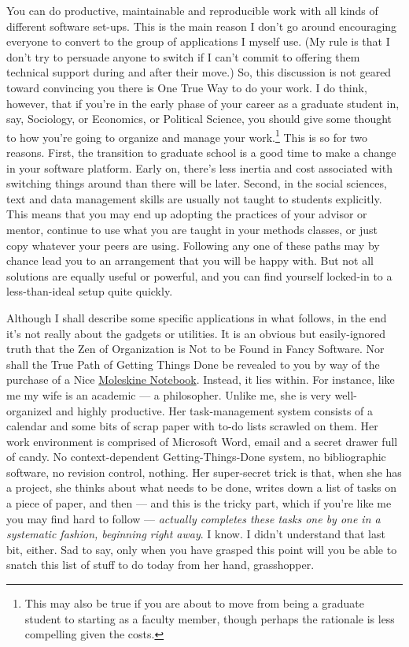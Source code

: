 \documentclass[11pt,article,oneside]{memoir}
\begin{document}
You can do productive, maintainable and reproducible work with all kinds of different software set-ups. This is the main reason I don't go around encouraging everyone to convert to the group of applications I myself use. (My rule is that I don't try to persuade anyone to switch if I can't commit to offering them technical support during and after their move.) So, this discussion is not geared toward convincing you there is One True Way to do your work. I do think, however, that if you're in the early phase of your career as a graduate student in, say, Sociology, or Economics, or Political Science, you should give some thought to how you're going to organize and manage your work.\footnote{This may also be true if you are about to move from being a graduate student to starting as a faculty member, though perhaps the rationale is less compelling given the costs.} This is so for two reasons. First, the transition to graduate school is a good time to make a change in your software platform. Early on, there's less inertia and cost associated with switching things around than there will be later. Second, in the social sciences, text and data management skills are usually not taught to students explicitly. This means that you may end up adopting the practices of your advisor or mentor, continue to use what you are taught in your methods classes, or just copy whatever your peers are using. Following any one of these paths may by chance lead you to an arrangement that you will be happy with. But not all solutions are equally useful or powerful, and you can find yourself locked-in to a less-than-ideal setup quite quickly.

Although I shall describe some specific applications in what follows, in the end it's not really about the gadgets or utilities. It is an obvious but easily-ignored truth that the Zen of Organization is Not to be Found in Fancy Software. Nor shall the True Path of Getting Things Done be revealed to you by way of the purchase of a Nice \href{http://www.moleskineus.com/}{Moleskine Notebook}. Instead, it lies within. For instance, like me my wife is an academic --- a philosopher. Unlike me, she is very well-organized and highly productive. Her task-management system consists of a calendar and some bits of scrap paper with to-do lists scrawled on them. Her work environment is comprised of Microsoft Word, email and a secret drawer full of candy. No context-dependent Getting-Things-Done system, no bibliographic software, no revision control, nothing. Her super-secret trick is that, when she has a project, she thinks about what needs to be done, writes down a list of tasks on a piece of paper, and then --- and this is the tricky part, which if you're like me you may find hard to follow --- \emph{actually completes these tasks one by one in a systematic fashion, beginning right away}. I know. I didn't understand that last bit, either. Sad to say, only when you have grasped this point will you be able to snatch this list of stuff to do today from her hand, grasshopper. 
\end{document}
